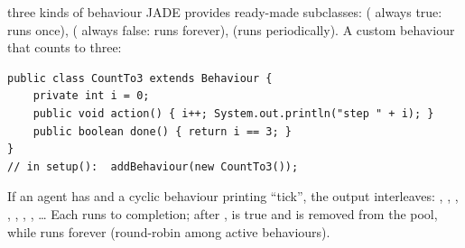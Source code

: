 \begin{nbexample}{three kinds of behaviour}
\notinslides
JADE provides ready-made subclasses:  ( always true: runs
once),  ( always false: runs forever),
 (runs periodically). A custom behaviour that counts to three:
\begin{verbatim}
public class CountTo3 extends Behaviour {
    private int i = 0;
    public void action() { i++; System.out.println("step " + i); }
    public boolean done() { return i == 3; }
}
// in setup():  addBehaviour(new CountTo3());
\end{verbatim}
If an agent has  and a cyclic behaviour  printing ``tick'', the output
interleaves: , , , , ,
, , \ldots{} Each  runs to completion; after
,  is true and  is removed from the pool, while
 runs forever (round-robin among active behaviours).
\end{nbexample}
